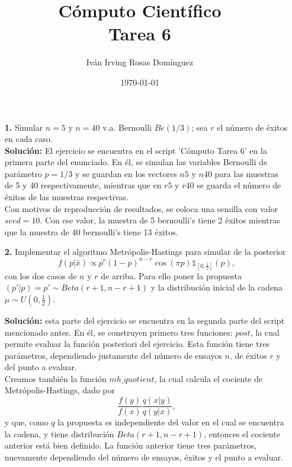 \documentclass[letterpaper]{article}
\title{\textbf{Cómputo Científico\\
Tarea 6\\
}}
\author{Iván Irving Rosas Domínguez}
\date{\today}
\newcommand{\1}{\mathds{1}}
\theoremstyle{definition}
\theoremstyle{definition}
\theoremstyle{definition}
\theoremstyle{definition}
\theoremstyle{definition}
\begin{document}
\maketitle

\begin{enumerate}
    \item[\textbf{1.}] Simular $n=5$ y $n=40$ v.a. Bernoulli $Be(1/3)$; sea $r$ el número 
    de éxitos en cada caso.\\

    \textbf{Solución:} El ejercicio se encuentra en el script 'Cómputo Tarea 6' en la primera parte del enunciado. En él, se simulan las 
    variables Bernoulli de parámetro $p=1/3$ y se guardan en los vectores $n5$ y $n40$ para las muestras de 5 y 40 respectivamente,
    mientras que en $r5$ y $r40$ se guarda el número de éxitos de las muestras respectivas.\\

    Con motivos de reproducción de resultados, se coloca una semilla con valor $seed=10$. Con ese valor, la muestra de 5 bernoulli's tiene 2 éxitos mientras que la muestra de
    40 bernoulli's tiene 13 éxitos.\\

    \item[\textbf{2.}] Implementar el algoritmo Metrópolis-Hastings para simular de 
    la posterior 
    \[
    f(p|\bar{x})\propto p^r(1-p)^{n-r}\cos(\pi p)\1_{[0,\frac{1}{2}]}(p),    
    \]
    con los dos casos de $n$ y $r$ de arriba. Para ello poner la propuesta $(p'|p)=p'\sim Beta(r+1,n-r+1)$
    y la distribución inicial de la cadena $\mu\sim U(0,\frac{1}{2})$.
    \newline

    \textbf{Solución:} esta parte del ejercicio se encuentra en la segunda parte del script mencionado antes. En él, se construyen primero 
    tres funciones: $post$, la cual permite evaluar la función posteriori del ejercicio. Esta función tiene tres parámetros, dependiendo 
    justamente del número de ensayos $n$, de éxitos $r$ y del punto a evaluar.\\

    Creamos también la función $mh\_quotient$, la cual calcula el cociente de Metrópolis-Hastings, dado por 
    \[
    \frac{f(y)}{f(x)}\frac{q(x|y)}{q(y|x)},    
    \]
    y que, como $q$ la propuesta es independiente del valor en el cual se encuentra la cadena, y 
    tiene distribución $Beta(r+1,n-r+1)$, entonces el cociente anterior está bien definido.
    La función anterior tiene tres parámetros, nuevamente dependiendo del número de ensayos, éxitos y 
    el punto a evaluar.\\


\end{enumerate}
\end{document}
